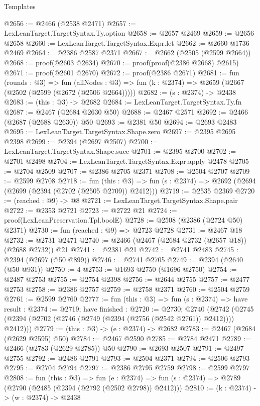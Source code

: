 \begin{lexlean}{Templates}
\begin{coremodule}
@2656 := @2466 (@2538 @2471)
@2657 := LexLeanTarget.TargetSyntax.Ty.option
@2658 := @2657 @2469
@2659 := @2656 @2658
@2660 := LexLeanTarget.TargetSyntax.Expr.let
@2662 := @2660 @1736 @2469
@2664 := @2386 @2587 @2371
@2667 := @2662 (@2505 (@2599 @2664))
@2668 := proof(@2603 @2634)
@2670 := proof(proof(@2386 @2668) @2615)
@2671 := proof(@2601 @2670)
@2672 := proof(@2386 @2671)
@2681 := fun (rounds : @3) =>
  fun (allNodes : @3) => fun (k : @2374) => @2659 (@2667 (@2502 (@2599 (@2672 (@2506 @2664)))))
@2682 := (s : @2374) -> @2438
@2683 := (this : @3) -> @2682
@2684 := LexLeanTarget.TargetSyntax.Ty.fn
@2687 := @2467 (@2684 @2630 @50)
@2688 := @2467 @2571
@2692 := @2466 (@2687 (@2688 @2630)) @50
@2693 := @2381 @50
@2694 := @2693 @2483
@2695 := LexLeanTarget.TargetSyntax.Shape.zero
@2697 := @2395 @2695 @2398
@2699 := @2394 (@2697 @2507)
@2700 := LexLeanTarget.TargetSyntax.Shape.succ
@2701 := @2395 @2700
@2702 := @2701 @2498
@2704 := LexLeanTarget.TargetSyntax.Expr.apply @2478
@2705 := @2704 @2509
@2707 := @2386 @2705 @2371
@2708 := @2504 @2707
@2709 := @2599 @2708
@2718 := fun (this : @3) =>
  fun (s : @2374) => @2692 (@2694 (@2699 (@2394 (@2702 (@2505 @2709)) @2412)))
@2719 := @2535 @2369
@2720 := (reached : @9) -> @8
@2721 := LexLeanTarget.TargetSyntax.Shape.pair
@2722 := @2353 @2721
@2723 := @2722 @21
@2724 := proof(LexLeanPreservation.Tpl.boolE)
@2728 := @2508 (@2386 (@2724 @50) @2371)
@2730 := fun (reached : @9) => @2723 @2728
@2731 := @2467 @18
@2732 := @2731 @2471
@2740 := @2466 (@2467 (@2684 @2732 (@2657 @18)) (@2688 @2732)) @21
@2741 := @2381 @21
@2742 := @2741 @2483
@2745 := @2394 (@2697 (@50 @899))
@2746 := @2741 @2705
@2749 := @2394 (@2640 (@50 @931))
@2750 := 4
@2753 := @1693 @2750 (@1696 @2750)
@2754 := @2487 @2753
@2755 := @2754 @2398
@2756 := @2644 @2755
@2757 := @2477 @2753
@2758 := @2386 @2757
@2759 := @2758 @2371
@2760 := @2504 @2759
@2761 := @2599 @2760
@2777 := fun (this : @3) =>
  fun (s : @2374) =>
  have result : @2374 := @2719;
  have finished : @2720 := @2730;
  @2740 (@2742 (@2745 (@2394 (@2702 (@2746 (@2749 (@2394 (@2756 (@2542 @2761)) @2412)))) @2412)))
@2779 := (this : @3) -> (e : @2374) -> @2682
@2783 := @2467 (@2684 (@2629 @2595) @50)
@2784 := @2467 @2590
@2785 := @2784 @2471
@2789 := @2466 (@2783 (@2629 @2785)) @50
@2790 := @2693 @2507
@2791 := @2497 @2755
@2792 := @2486 @2791
@2793 := @2504 @2371
@2794 := @2506 @2793
@2795 := @2704 @2794
@2797 := @2386 @2795 @2759
@2798 := @2599 @2797
@2808 := fun (this : @3) =>
  fun (e : @2374) => fun (s : @2374) => @2789 (@2790 (@2485 (@2394 (@2792 (@2502 @2798)) @2412)))
@2810 := (k : @2374) -> (w : @2374) -> @2438

\end{coremodule}
\end{lexlean}
